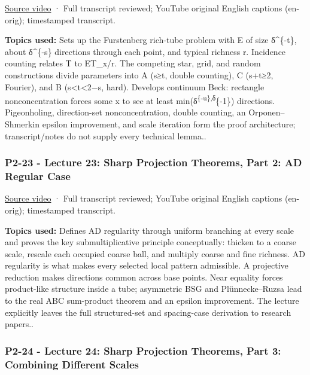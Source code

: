 \href{https://www.youtube.com/watch?v=hBG7nMXTOcw}{Source video} · Full transcript reviewed; YouTube original English captions (en-orig); timestamped transcript.

\textbf{Topics used:} Sets up the Furstenberg rich-tube problem with E of size δ\^{}\{-t\}, about δ\^{}\{-s\} directions through each point, and typical richness r. Incidence counting relates \textbar T\textbar{} to \textbar E\textbar\textbar T\_x\textbar/r. The competing star, grid, and random constructions divide parameters into A (s≥t, double counting), C (s+t≥2, Fourier), and B (s\textless t\textless2−s, hard). Develops continuum Beck: rectangle nonconcentration forces some x to see at least min(δ\textsuperscript{\{-u\},δ}\{-1\}) directions. Pigeonholing, direction-set nonconcentration, double counting, an Orponen--Shmerkin epsilon improvement, and scale iteration form the proof architecture; transcript/notes do not supply every technical lemma..

\subsubsection{P2-23 - Lecture 23: Sharp Projection Theorems, Part 2: AD Regular Case}\label{04-visual-computing-ii-ch036-p2-23---lecture-23-sharp-projection-theorems-part-2-ad-regular-case}

\href{https://www.youtube.com/watch?v=I6ZSrgxiofs}{Source video} · Full transcript reviewed; YouTube original English captions (en-orig); timestamped transcript.

\textbf{Topics used:} Defines AD regularity through uniform branching at every scale and proves the key submultiplicative principle conceptually: thicken to a coarse scale, rescale each occupied coarse ball, and multiply coarse and fine richness. AD regularity is what makes every selected local pattern admissible. A projective reduction makes directions common across base points. Near equality forces product-like structure inside a tube; asymmetric BSG and Plünnecke--Ruzsa lead to the real ABC sum-product theorem and an epsilon improvement. The lecture explicitly leaves the full structured-set and spacing-case derivation to research papers..

\subsubsection{P2-24 - Lecture 24: Sharp Projection Theorems, Part 3: Combining Different Scales}\label{04-visual-computing-ii-ch036-p2-24---lecture-24-sharp-projection-theorems-part-3-combining-different-scales}

